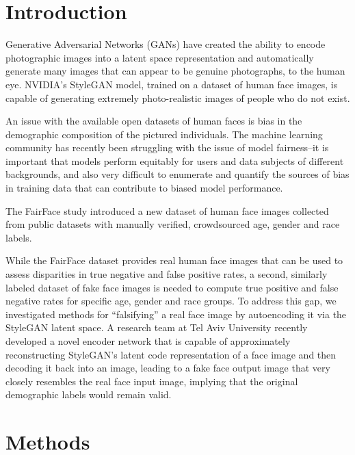 \documentclass[11pt, letterpaper]{article}
\begin{document}
\begin{multicols}{2}
  \section{Introduction}

  Generative Adversarial Networks (GANs) have created the ability to
  encode photographic images into a latent space representation and
  automatically generate many images that can appear to be genuine
  photographs, to the human eye. NVIDIA's StyleGAN\cite{stylegan} model, trained
  on a dataset of human face images, is capable of generating extremely
  photo-realistic images of people who do not exist.

  An issue with the available open datasets of human faces is bias in the
  demographic composition of the pictured individuals. The machine learning
  community has recently been struggling with the issue of model fairness--it is
  important that models perform equitably for users and data subjects of different
  backgrounds, and also very difficult to enumerate and quantify the sources
  of bias in training data that can contribute to biased model performance.

  The FairFace\cite{karkkainen2019fairface} study introduced a new dataset of
  human face images collected from public datasets with manually verified,
  crowdsourced age, gender and race labels.

  While the FairFace dataset provides real human face images that can be used to
  assess disparities in true negative and false positive rates, a second,
  similarly labeled dataset of fake face images is needed to compute true
  positive and false negative rates for specific age, gender and race groups.
  To address this gap, we investigated methods for ``falsifying'' a real face
  image by autoencoding it via the StyleGAN latent space.
  A research team at Tel Aviv University recently developed a novel encoder
  network\cite{richardson2020encoding} that is capable of approximately
  reconstructing StyleGAN's latent code representation of a face image and then
  decoding it back into an image, leading to a fake face output image that very closely
  resembles the real face input image, implying that the original demographic labels
  would remain valid.

  \section{Methods}


\end{multicols}
\end{document}

